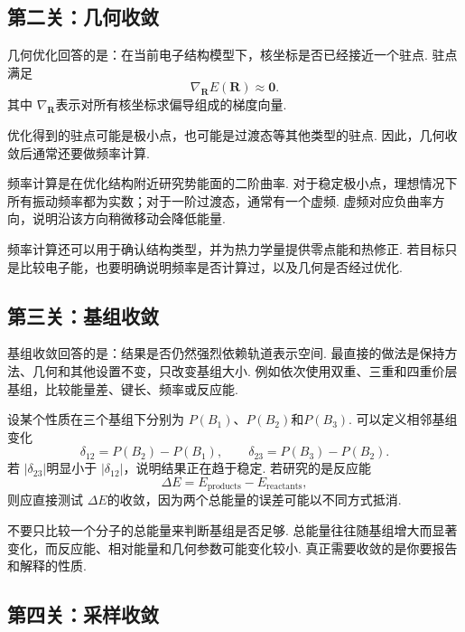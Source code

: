 \documentclass[UTF8,11pt,a4paper,openany]{ctexbook}
\begin{document}
\subsection{第二关：几何收敛}

几何优化回答的是：在当前电子结构模型下，核坐标是否已经接近一个驻点. 驻点满足
\[
\nabla_{\mathbf R}E(\mathbf R)\approx\mathbf 0.
\]
其中 $\nabla_{\mathbf R}$表示对所有核坐标求偏导组成的梯度向量. 

优化得到的驻点可能是极小点，也可能是过渡态等其他类型的驻点. 因此，几何收敛后通常还要做频率计算. 

\begin{definitionbox}
频率计算是在优化结构附近研究势能面的二阶曲率. 对于稳定极小点，理想情况下所有振动频率都为实数；对于一阶过渡态，通常有一个虚频. 虚频对应负曲率方向，说明沿该方向稍微移动会降低能量. 
\end{definitionbox}

频率计算还可以用于确认结构类型，并为热力学量提供零点能和热修正. 若目标只是比较电子能，也要明确说明频率是否计算过，以及几何是否经过优化. 

\subsection{第三关：基组收敛}

基组收敛回答的是：结果是否仍然强烈依赖轨道表示空间. 最直接的做法是保持方法、几何和其他设置不变，只改变基组大小. 例如依次使用双重、三重和四重价层基组，比较能量差、键长、频率或反应能. 

\begin{derivationbox}
设某个性质在三个基组下分别为 $P(B_1)$、$P(B_2)$和$P(B_3)$. 可以定义相邻基组变化
\[
\delta_{12}=P(B_2)-P(B_1),\qquad
\delta_{23}=P(B_3)-P(B_2).
\]
若 $|\delta_{23}|$明显小于 $|\delta_{12}|$，说明结果正在趋于稳定. 若研究的是反应能
\[
\Delta E=E_{\mathrm{products}}-E_{\mathrm{reactants}},
\]
则应直接测试 $\Delta E$的收敛，因为两个总能量的误差可能以不同方式抵消. 
\end{derivationbox}

\begin{limitbox}
不要只比较一个分子的总能量来判断基组是否足够. 总能量往往随基组增大而显著变化，而反应能、相对能量和几何参数可能变化较小. 真正需要收敛的是你要报告和解释的性质. 
\end{limitbox}

\subsection{第四关：采样收敛}
\end{document}
